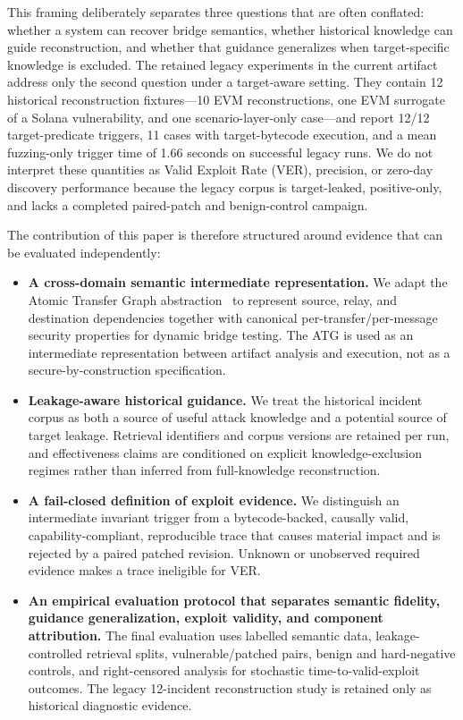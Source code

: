 This framing deliberately separates three questions that are often conflated: whether a system can recover bridge semantics, whether historical knowledge can guide reconstruction, and whether that guidance generalizes when target-specific knowledge is excluded. The retained legacy experiments in the current artifact address only the second question under a target-aware setting. They contain 12 historical reconstruction fixtures---10 EVM reconstructions, one EVM surrogate of a Solana vulnerability, and one scenario-layer-only case---and report 12/12 target-predicate triggers, 11 cases with target-bytecode execution, and a mean fuzzing-only trigger time of 1.66 seconds on successful legacy runs. We do not interpret these quantities as Valid Exploit Rate (VER), precision, or zero-day discovery performance because the legacy corpus is target-leaked, positive-only, and lacks a completed paired-patch and benign-control campaign.

The contribution of this paper is therefore structured around evidence that can be evaluated independently:

\begin{itemize}
    \item \textbf{A cross-domain semantic intermediate representation.} We adapt the Atomic Transfer Graph abstraction~\citep{dubler2025atg} to represent source, relay, and destination dependencies together with canonical per-transfer/per-message security properties for dynamic bridge testing. The ATG is used as an intermediate representation between artifact analysis and execution, not as a secure-by-construction specification.

    \item \textbf{Leakage-aware historical guidance.} We treat the historical incident corpus as both a source of useful attack knowledge and a potential source of target leakage. Retrieval identifiers and corpus versions are retained per run, and effectiveness claims are conditioned on explicit knowledge-exclusion regimes rather than inferred from full-knowledge reconstruction.

    \item \textbf{A fail-closed definition of exploit evidence.} We distinguish an intermediate invariant trigger from a bytecode-backed, causally valid, capability-compliant, reproducible trace that causes material impact and is rejected by a paired patched revision. Unknown or unobserved required evidence makes a trace ineligible for VER.

    \item \textbf{An empirical evaluation protocol that separates semantic fidelity, guidance generalization, exploit validity, and component attribution.} The final evaluation uses labelled semantic data, leakage-controlled retrieval splits, vulnerable/patched pairs, benign and hard-negative controls, and right-censored analysis for stochastic time-to-valid-exploit outcomes. The legacy 12-incident reconstruction study is retained only as historical diagnostic evidence.
\end{itemize}

